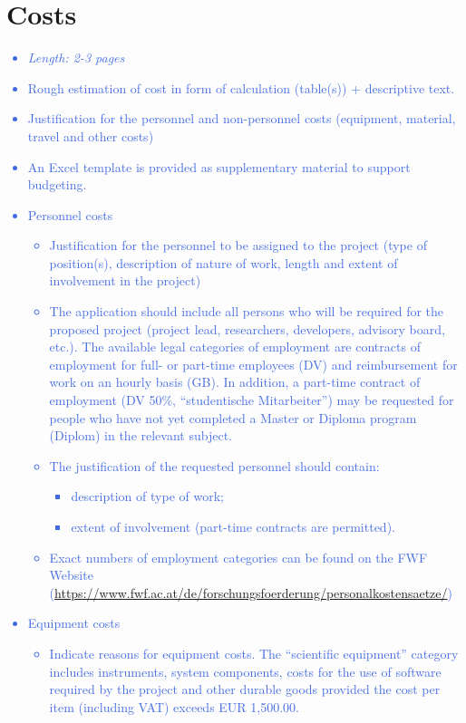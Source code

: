 \documentclass[a4paper,11pt]{article}
\providecommand*{\note}[1]{\small \textcolor{RoyalBlue}{\begin{minipage}{\textwidth}{#1}\end{minipage}}}
\begin{document}
\section{Costs}
\label{sect:costs}

\note{
\begin{itemize}
\item {\em Length: 2-3 pages}
\item Rough estimation of cost in form of calculation (table(s)) + descriptive text.
\item Justification for the personnel and non-personnel costs (equipment, material, travel and other costs)
\item An Excel template is provided as supplementary material to support budgeting.
\item Personnel costs
	\begin{itemize}
	\item     Justification for the personnel to be assigned to the project (type of position(s), description of nature of work, length and extent of involvement in the project)
	\item     The application should include all persons who will be required for the proposed project (project lead, researchers, developers, advisory board, etc.). The available legal categories of employment are contracts of employment for full- or part-time employees (DV) and reimbursement for work on an hourly basis (GB). In addition, a part-time contract of employment (DV 50\%, ``studentische Mitarbeiter'') may be requested for people who have not yet completed a Master or Diploma program (Diplom) in the relevant subject.
	 \item    The justification of the requested personnel should contain:
		\begin{itemize}
		\item 	        description of type of work;
		\item 		        extent of involvement (part-time contracts are permitted).
		\end{itemize}
	\item Exact numbers of employment categories can be found on the FWF
        Website (\href{https://www.fwf.ac.at/de/forschungsfoerderung/personalkostensaetze/}{https://www.fwf.ac.at/de/forschungsfoerderung/personalkostensaetze/})
	\end{itemize}
\item Equipment costs
	\begin{itemize}
	\item     Indicate reasons for equipment costs. The ``scientific equipment'' category includes instruments, system components, costs for the use of software required by the project and other durable goods provided the cost per item (including VAT) exceeds EUR 1,500.00.

\end{itemize}
\end{itemize}}
\end{document}
